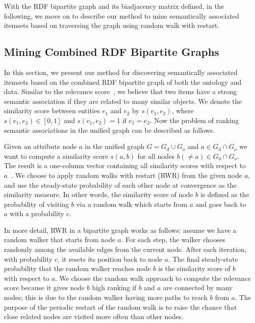 With the RDF bipartite graph and its biadjacency matrix defined, in the following, we move on to describe our method to mine semantically associated itemsets based on traversing the graph using random walk with restart.


\subsection{Mining Combined RDF Bipartite Graphs}
In this section, we present our method for discovering semantically associated itemsets based on the combined RDF bipartite graph of both the ontology and data. Similar to the relevance score~\cite{SunEtal05}, we believe that two items have a strong semantic association if they are related to many similar objects. We denote the similarity score between entities $e_1$ and $e_2$ by $s(e_1, e_2)$, where $s(e_1,e_2) \in [0, 1]$ and $s(e_1, e_2) = 1 \text{ if } e_1 = e_2$. Now the problem of ranking semantic associations in the unified graph can be described as follows.

Given an attribute node $a$ in the unified graph $G = G_d \cup G_o$ and $a \in G_d \cap G_o$ we want to compute a similarity score $s(a, b)$ for all nodes $b(\neq a) \in G_d \cap G_o$. The result is a one-column vector containing all similarity scores with respect to $a$~\cite{Chen_tuplerank:ranking}. We choose to apply random walks with restart (RWR) from the given node $a$, and use the steady-state probability of each other node at convergence as the similarity measure. In other words, the similarity score of node $b$ is defined as the probability of visiting $b$ via a random walk which starts from $a$ and goes back to $a$ with a probability $c$.

In more detail, RWR in a bipartite graph works as follows: assume we have a random walker that starts from node $a$. For each step, the walker chooses randomly among the available edges from the current node. After each iteration, with probability $c$, it resets its position back to node $a$. The final steady-state probability that the random walker reaches node $b$ is the similarity score of $b$ with respect to $a$. We choose the random walk approach to compute the relevance score because it gives node $b$ high ranking if $b$ and $a$ are connected by many nodes; this is due to the random walker having more paths to reach $b$ from $a$. The purpose of the periodic restart of the random walk is to raise the chance that close related nodes are visited more often than other nodes.

